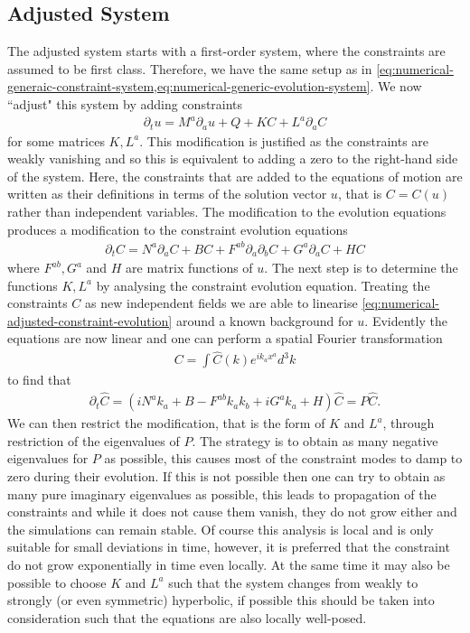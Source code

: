 \documentclass[10pt]{report}
\theoremstyle{definition}
\begin{document}
\subsection{Adjusted System}
The adjusted system starts with a first-order system, where the constraints are assumed to be first class. Therefore, we have the same setup as in \cref{eq:numerical-generaic-constraint-system,eq:numerical-generic-evolution-system}. We now ``adjust" this system by adding constraints 
\begin{align}
    \partial_t u = M^a \partial_a u + Q +K C + L^a \partial_a C
\end{align}
for some matrices $K, L^a$. This modification is justified as the constraints are weakly vanishing and so this is equivalent to adding a zero to the right-hand side of the system. Here, the constraints that are added to the equations of motion are written as their definitions in terms of the solution vector $u$, that is  $C = C(u)$ rather than independent variables. The modification to the evolution equations produces a modification to the constraint evolution equations 
\begin{align} \label{eq:numerical-adjusted-constraint-evolution}
    \partial_t C = N^a \partial_a C + B C + F^{ab} \partial_a \partial_b C + G^a \partial_a C + H C 
\end{align}
where $F^{ab}, G^a$ and $H$ are matrix functions of $u$. The next step is to determine the functions $K, L^a$ by analysing the constraint evolution equation. Treating the constraints $C$ as new independent fields we are able to linearise \cref{eq:numerical-adjusted-constraint-evolution} around a known background for $u$. Evidently the equations are now linear and one can perform a spatial Fourier transformation
\begin{align}
    C = \int \hat{C}(k) e^{i k_a x^a} d^3k
\end{align}
to find that 
\begin{align}
    \partial_t \hat{C} = (i N^a k_a + B - F^{ab} k_a k_b + i G^a k_a + H) \hat{C} = P \hat{C}.
\end{align}
We can then restrict the modification, that is the form of $K$ and $L^a$, through restriction of the eigenvalues of $P$. The strategy is to obtain as many negative eigenvalues for $P$ as possible, this causes most of the constraint modes to damp to zero during their evolution. If this is not possible then one can try to obtain as many pure imaginary eigenvalues as possible, this leads to propagation of the constraints and while it does not cause them vanish, they do not grow either and the simulations can remain stable. Of course this analysis is local and is only suitable for small deviations in time, however, it is preferred that the constraint do not grow exponentially in time even locally. At the same time it may also be possible to choose $K$ and $L^a$ such that the system changes from weakly to strongly (or even symmetric) hyperbolic, if possible this should be taken into consideration such that the equations are also locally well-posed.
\end{document}
